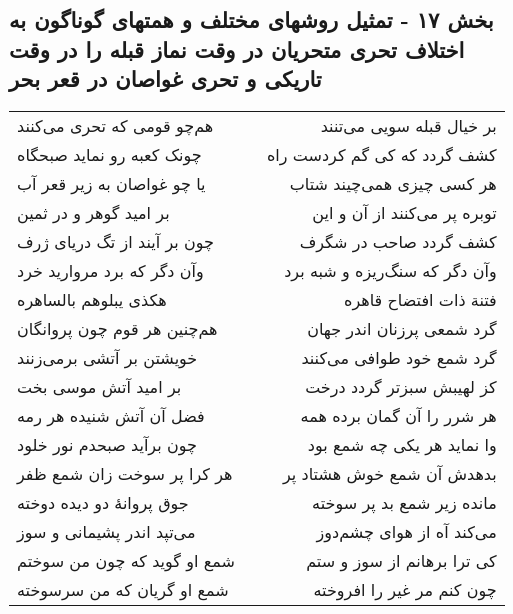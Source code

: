 \begin{center}
\section*{بخش ۱۷ - تمثیل روشهای مختلف و همتهای گوناگون به اختلاف تحری  متحریان در وقت نماز قبله را در وقت تاریکی و تحری غواصان در  قعر بحر}
\label{sec:sh017}
\begin{longtable}{l p{0.5cm} r}
هم‌چو قومی که تحری می‌کنند
&&
بر خیال قبله سویی می‌تنند
\\
چونک کعبه رو نماید صبحگاه
&&
کشف گردد که کی گم کردست راه
\\
یا چو غواصان به زیر قعر آب
&&
هر کسی چیزی همی‌چیند شتاب
\\
بر امید گوهر و در ثمین
&&
توبره پر می‌کنند از آن و این
\\
چون بر آیند از تگ دریای ژرف
&&
کشف گردد صاحب در شگرف
\\
وآن دگر که برد مروارید خرد
&&
وآن دگر که سنگ‌ریزه و شبه برد
\\
هکذی یبلوهم بالساهره
&&
فتنة ذات افتضاح قاهره
\\
هم‌چنین هر قوم چون پروانگان
&&
گرد شمعی پرزنان اندر جهان
\\
خویشتن بر آتشی برمی‌زنند
&&
گرد شمع خود طوافی می‌کنند
\\
بر امید آتش موسی بخت
&&
کز لهیبش سبزتر گردد درخت
\\
فضل آن آتش شنیده هر رمه
&&
هر شرر را آن گمان برده همه
\\
چون برآید صبحدم نور خلود
&&
وا نماید هر یکی چه شمع بود
\\
هر کرا پر سوخت زان شمع ظفر
&&
بدهدش آن شمع خوش هشتاد پر
\\
جوق پروانهٔ دو دیده دوخته
&&
مانده زیر شمع بد پر سوخته
\\
می‌تپد اندر پشیمانی و سوز
&&
می‌کند آه از هوای چشم‌دوز
\\
شمع او گوید که چون من سوختم
&&
کی ترا برهانم از سوز و ستم
\\
شمع او گریان که من سرسوخته
&&
چون کنم مر غیر را افروخته
\\
\end{longtable}
\end{center}
